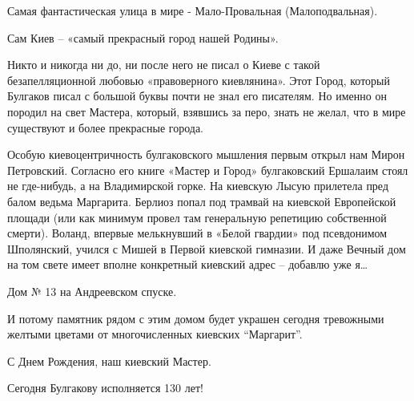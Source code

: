 Самая фантастическая улица в мире - Мало-Провальная (Малоподвальная).

Сам Киев – «самый прекрасный город нашей Родины». 

Никто и никогда ни до, ни после него не писал о Киеве с такой
безапелляционной любовью «правоверного киевлянина». Этот Город, который
Булгаков писал с большой буквы почти не знал его писателям. Но именно
он породил на свет Мастера, который, взявшись за перо, знать не желал,
что в мире существуют и более прекрасные города.

Особую киевоцентричность булгаковского мышления первым открыл нам Мирон
Петровский. Согласно его книге «Мастер и Город» булгаковский Ершалаим стоял не
где-нибудь, а на Владимирской горке. На киевскую Лысую прилетела пред балом
ведьма Маргарита. Берлиоз попал под трамвай на киевской Европейской площади
(или как минимум провел там генеральную репетицию собственной смерти). Воланд,
впервые мелькнувший в «Белой гвардии» под псевдонимом Шполянский, учился с
Мишей в Первой киевской гимназии.  И даже Вечный дом на том свете имеет вполне
конкретный киевский адрес – добавлю уже я… 

Дом № 13 на Андреевском спуске. 

И потому памятник рядом с этим домом будет украшен сегодня тревожными желтыми
цветами от многочисленных киевских \enquote{Маргарит}.

С Днем Рождения, наш киевский Мастер. 

Сегодня Булгакову исполняется 130 лет!
